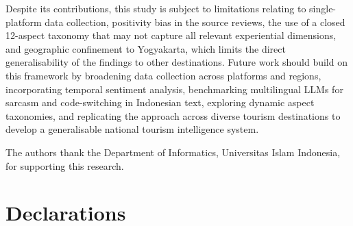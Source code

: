 \documentclass[pdflatex,sn-mathphys-num]{sn-jnl}
\begin{document}
Despite its contributions, this study is subject to limitations relating to single-platform data collection, positivity bias in the source reviews, the use of a closed 12-aspect taxonomy that may not capture all relevant experiential dimensions, and geographic confinement to Yogyakarta, which limits the direct generalisability of the findings to other destinations. Future work should build on this framework by broadening data collection across platforms and regions, incorporating temporal sentiment analysis, benchmarking multilingual LLMs for sarcasm and code-switching in Indonesian text, exploring dynamic aspect taxonomies, and replicating the approach across diverse tourism destinations to develop a generalisable national tourism intelligence system.

\backmatter


The authors thank the Department of Informatics, Universitas Islam Indonesia, for supporting this research.

\section*{Declarations}
\end{document}
